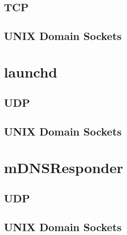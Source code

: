 \subsection{TCP}
\label{sec:codeTcp}

\subsection{UNIX Domain Sockets}
\label{sec:codeUnix}

\section{launchd}
\label{sec:launchd}

\subsection{UDP}
\label{sec:launchdUdp}

\subsection{UNIX Domain Sockets}
\label{sec:launchdUnix}

\section{mDNSResponder}
\label{sec:mdns}

\subsection{UDP}
\label{sec:mdnsUdp}

\subsection{UNIX Domain Sockets}
\label{sec:mdnsUnix}

